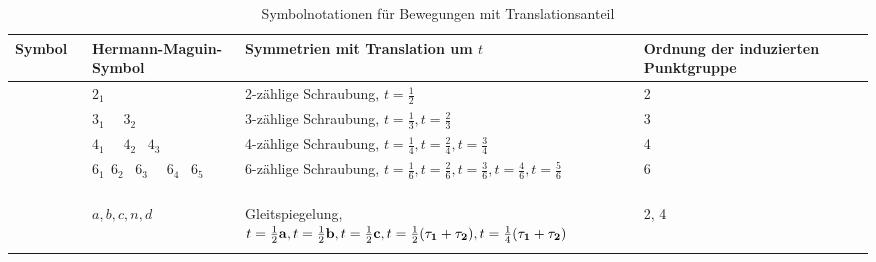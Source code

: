 \begin{table}[htp]
	\caption{Symbolnotationen für Bewegungen mit Translationsanteil}
	\begin{tabular}{C{1.5cm}C{3cm}C{5cm}C{3cm}c}
		\toprule
		Symbol                                                       & Hermann-Maguin-Symbol       & Symmetrien mit Translation um $t$                                                                                                                                                                       & Ordnung der induzierten Punktgruppe & \\
		\midrule
		                                                     & $2_1$                                      & 2-zählige Schraubung, $t=\frac{1}{2}$                                                                                                                                                                       & 2                      &  \\
		 \ \                                         & $3_1$ \ \  $3_2$                           & 3-zählige Schraubung, $t=\frac{1}{3}, t=\frac{2}{3}$                                                                                                                                                       & 3                       & \\
		\ \   \ \                            & $4_1$ \ \ $4_2$ \ \newline $4_3$                  & 4-zählige Schraubung, $t=\frac{1}{4}, t=\frac{2}{4}, t=\frac{3}{4}$                                                                                                                                        & 4                        & \\
		 \ \  \ \  \ \  \ \  & $6_1 \ \ 6_2$ \ \newline $6_3$ \ \ $6_4$ \ \newline $6_5$ & 6-zählige Schraubung, $t=\frac{1}{6}, t=\frac{2}{6}, t=\frac{3}{6},$\newline$ t=\frac{4}{6}, t=\frac{5}{6}$                                                                                                          & 6                       & \\
		                                                      & $a, b, c, n, d$                            &  Gleitspiegelung, $t=\frac{1}{2}\mathbf{a}, t=\frac{1}{2}\mathbf{b}, t=\frac{1}{2}\mathbf{c}, t=\frac{1}{2}(\mathbf{\tau_1}+\mathbf{\tau_2}), t=\frac{1}{4}(\mathbf{\tau_1} +\mathbf{\tau_2}) $ & 2, 4 & \\                  
		\bottomrule
\label{table:symbole_raum}
	\end{tabular}
\end{table}

